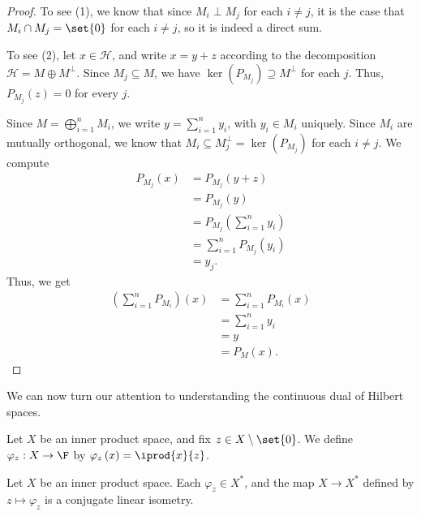 \documentclass[10pt]{mypackage}
\begin{document}
\begin{proof}
  To see (1), we know that since $M_i\perp M_j$ for each $i\neq j$, it is the case that $M_i\cap M_j = \set{0}$ for each $i\neq j$, so it is indeed a direct sum.\newline

  To see (2), let $x\in \mathcal{H}$, and write $x = y + z$ according to the decomposition $\mathcal{H} = M\oplus M^{\perp}$. Since $M_j\subseteq M$, we have $\ker\left(P_{M_j}\right) \supseteq M^{\perp}$ for each $j$. Thus, $P_{M_j}(z) = 0$ for every $j$.\newline

  Since $M = \bigoplus_{i=1}^{n}M_i$, we write $y = \sum_{i=1}^{n}y_i$, with $y_i\in M_i$ uniquely. Since $M_i$ are mutually orthogonal, we know that $M_i\subseteq M_{j}^{\perp} = \ker\left(P_{M_j}\right)$ for each $i\neq j$. We compute
  \begin{align*}
    P_{M_j}\left(x\right) &= P_{M_j}\left(y + z\right)\\
                          &= P_{M_j}\left(y\right)\\
                          &= P_{M_j}\left(\sum_{i=1}^{n}y_i\right)\\
                          &= \sum_{i=1}^{n}P_{M_j}\left(y_i\right)\\
                          &= y_j.
  \end{align*}
  Thus, we get
  \begin{align*}
    \left(\sum_{i=1}^{n}P_{M_i}\right)\left(x\right) &= \sum_{i=1}^{n}P_{M_i}\left(x\right)\\
                                                     &= \sum_{i=1}^{n}y_i\\
                                                     &= y\\
                                                     &= P_{M}\left(x\right).
  \end{align*}
  
\end{proof}
We can now turn our attention to understanding the continuous dual of Hilbert spaces.
\begin{definition}
  Let $X$ be an inner product space, and fix $z\in X\setminus \set{0}$. We define $\varphi_z: X\rightarrow \F$ by $\varphi_z\left(x\right) = \iprod{x}{z}$.
\end{definition}
\begin{proposition}
  Let $X$ be an inner product space. Each $\varphi_z\in X^{\ast}$, and the map $X\rightarrow X^{\ast}$ defined by $z\mapsto \varphi_z$ is a conjugate linear isometry.
\end{proposition}
\end{document}
